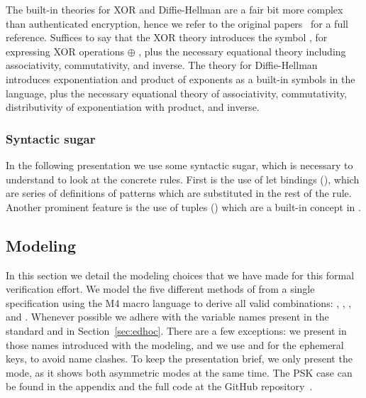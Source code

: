 The built-in theories for XOR and Diffie-Hellman are a fair bit more complex
than authenticated encryption, hence we refer to the original
papers~\cite{DBLP:conf/csfw/DreierHRS18,DBLP:conf/csfw/SchmidtMCB12}
for a full reference.
%
Suffices to say that the XOR theory introduces the symbol , for
expressing XOR operations  $\oplus$ , plus the necessary equational theory
including associativity, commutativity, and inverse.
%
The theory for Diffie-Hellman introduces exponentiation  and product of
exponents  as a built-in symbols in the language, plus the necessary equational
theory of associativity, commutativity, distributivity of exponentiation with
product, and inverse.

\spacehack
\subsubsection{Syntactic sugar} In the following presentation we use some syntactic
sugar, which is necessary to understand to look at the concrete rules. First is
the use of let bindings (), which are series of
definitions of patterns which are substituted in the rest of the rule. Another
prominent feature is the use of tuples () which are a
built-in concept in \mTamarin.

\spacehack
\subsection{Modeling \mEdhoc{}}
\fillhack
In this section we detail the modeling choices that we have made for this formal
verification effort.
%
We model the five different methods of \mEdhoc{} from a single specification
using the M4 macro language to derive all valid combinations: \mPskPsk,
\mSigSig, \mSigStat, \mStatSig{} and \mStatStat.
%
Whenever possible we adhere with the variable names present in the standard and
in Section~\ref{sec:edhoc}. There are a few exceptions: we present in
 those names introduced with the modeling, and we use  and
 for the ephemeral keys, to avoid name clashes.
%
%
To keep the presentation brief, we only present the \mStatSig{} mode, as it
shows both asymmetric modes at the same time. The PSK case can be found in the
appendix and the full code at the GitHub repository~\cite{edhocTamarinRepo}.
\spacehack
